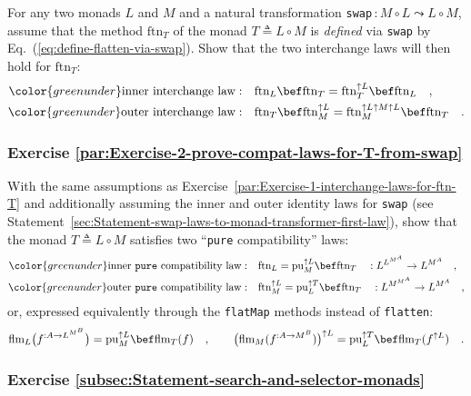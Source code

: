 For any two monads $L$ and $M$ and a natural transformation \lstinline!swap!$\,:M\circ L\leadsto L\circ M$,
assume that the method $\text{ftn}_{T}$ of the monad $T\triangleq L\circ M$
is \emph{defined} via \lstinline!swap! by Eq.~(\ref{eq:define-flatten-via-swap}).
Show that the two interchange laws will then hold for $\text{ftn}_{T}$:
\begin{align*}
{\color{greenunder}\text{inner interchange law}:}\quad & \text{ftn}_{L}\bef\text{ftn}_{T}=\text{ftn}_{T}^{\uparrow L}\bef\text{ftn}_{L}\quad,\\
{\color{greenunder}\text{outer interchange law}:}\quad & \text{ftn}_{T}\bef\text{ftn}_{M}^{\uparrow L}=\text{ftn}_{M}^{\uparrow L\uparrow M\uparrow L}\bef\text{ftn}_{T}\quad.
\end{align*}


\subsubsection{Exercise \label{par:Exercise-2-prove-compat-laws-for-T-from-swap}\ref{par:Exercise-2-prove-compat-laws-for-T-from-swap}}

With the same assumptions as Exercise~\ref{par:Exercise-1-interchange-laws-for-ftn-T}
and additionally assuming the inner and outer identity laws for \lstinline!swap!
(see Statement~\ref{sec:Statement-swap-laws-to-monad-transformer-first-law}),
show that the monad $T\triangleq L\circ M$ satisfies two \textsf{``}\lstinline!pure!
compatibility\textsf{''} laws:
\begin{align*}
{\color{greenunder}\text{inner \texttt{pure} compatibility law}:}\quad & \text{ftn}_{L}=\text{pu}_{M}^{\uparrow L}\bef\text{ftn}_{T}\quad:L^{L^{M^{A}}}\rightarrow L^{M^{A}}\quad,\\
{\color{greenunder}\text{outer \texttt{pure} compatibility law}:}\quad & \text{ftn}_{M}^{\uparrow L}=\text{pu}_{L}^{\uparrow T}\bef\text{ftn}_{T}\quad:L^{M^{M^{A}}}\rightarrow L^{M^{A}}\quad,
\end{align*}
or, expressed equivalently through the \lstinline!flatMap! methods
instead of \lstinline!flatten!:
\[
\text{flm}_{L}\big(f^{:A\rightarrow L^{M^{B}}}\big)=\text{pu}_{M}^{\uparrow L}\bef\text{flm}_{T}(f)\quad,\quad\quad\big(\text{flm}_{M}(f^{:A\rightarrow M^{B}})\big)^{\uparrow L}=\text{pu}_{L}^{\uparrow T}\bef\text{flm}_{T}(f^{\uparrow L})\quad.
\]


\subsubsection{Exercise \label{subsec:Statement-search-and-selector-monads}\ref{subsec:Statement-search-and-selector-monads}}

